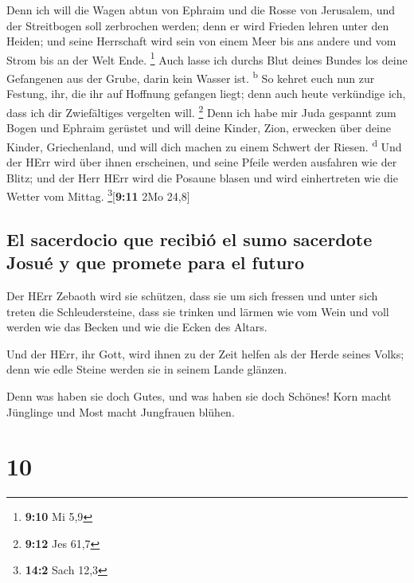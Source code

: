 Denn ich will die Wagen abtun von Ephraim und die Rosse
von Jerusalem, und der Streitbogen soll zerbrochen werden; denn er wird
Frieden lehren unter den Heiden; und seine Herrschaft wird sein von
einem Meer bis ans andere und vom Strom bis an der Welt Ende.
\footnote{\textbf{9:10} Mi 5,9}  Auch lasse ich durchs
Blut deines Bundes los deine Gefangenen aus der Grube, darin kein Wasser
ist. \textsuperscript{b}  So kehret euch nun zur Festung,
ihr, die ihr auf Hoffnung gefangen liegt; denn auch heute verkündige
ich, dass ich dir Zwiefältiges vergelten will. \footnote{\textbf{9:12}
  Jes 61,7}  Denn ich habe mir Juda gespannt zum Bogen
und Ephraim gerüstet und will deine Kinder, Zion, erwecken über deine
Kinder, Griechenland, und will dich machen zu einem Schwert der Riesen.
\textsuperscript{d}  Und der HErr wird über ihnen
erscheinen, und seine Pfeile werden ausfahren wie der Blitz; und der
Herr HErr wird die Posaune blasen und wird einhertreten wie die Wetter
vom Mittag. \footnote{\textbf{14:2} Sach 12,3}{[}\textbf{9:11} 2Mo
24,8{]}

\hypertarget{el-sacerdocio-que-recibiuxf3-el-sumo-sacerdote-josuuxe9-y-que-promete-para-el-futuro}{%
\subsection{El sacerdocio que recibió el sumo sacerdote Josué y que
promete para el
futuro}\label{el-sacerdocio-que-recibiuxf3-el-sumo-sacerdote-josuuxe9-y-que-promete-para-el-futuro}}

 Der HErr Zebaoth wird sie schützen, dass sie um sich
fressen und unter sich treten die Schleudersteine, dass sie trinken und
lärmen wie vom Wein und voll werden wie das Becken und wie die Ecken des
Altars.

 Und der HErr, ihr Gott, wird ihnen zu der Zeit helfen
als der Herde seines Volks; denn wie edle Steine werden sie in seinem
Lande glänzen.

 Denn was haben sie doch Gutes, und was haben sie doch
Schönes! Korn macht Jünglinge und Most macht Jungfrauen blühen.

\hypertarget{section-9}{%
\section{10}\label{section-9}}

